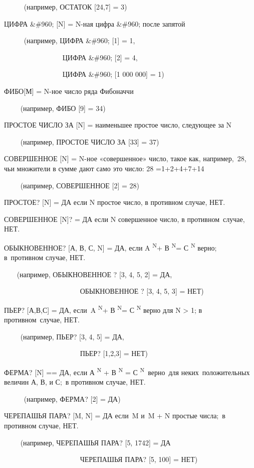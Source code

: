 \documentclass[../main.tex]{subfiles}
\begin{document}
~~~~~ (например, ОСТАТОК {[}24,7{]} = 3)

ЦИФРА \&\#960; {[}N{]} = N-ная цифра \&\#960; после запятой~~

~~~~~ (например, ЦИФРА \&\#960; {[}1{]} = 1,~

~~~~~~~~~~~~~~~~ ЦИФРА \&\#960; {[}2{]} = 4,

~~~~~~~~~~~~~~~~ ЦИФРА \&\#960; {[}1 000 000{]} = 1)

ФИБО{[}М{]} = N-ное число ряда Фибоначчи

~~~~ (например, ФИБО {[}9{]} = 34)

ПРОСТОЕ ЧИСЛО ЗА {[}N{]} = наименьшее простое число, следующее за N

~~~~ (например, ПРОСТОЕ ЧИСЛО ЗА {[}33{]} = 37)

СОВЕРШЕННОЕ {[}N{]} = N-ное «совершенное» число, такое как, например,~28, чьи множители в сумме дают само это число: 28 =1+2+4+7+14

~~~~ (например, СОВЕРШЕННОЕ {[}2{]} = 28)

ПРОСТОЕ? {[}N{]} = ДА если N простое число, в противном случае, НЕТ.

СОВЕРШЕННОЕ {[}N{]}? = ДА если N совершенное число, в противном~случае, НЕТ.

ОБЫКНОВЕННОЕ? {[}А, В, С, N{]} = ДА, если A \textsuperscript{N}+ В \textsuperscript{N}= С \textsuperscript{N} верно; в~противном случае, НЕТ.

~~~ (например, ОБЫКНОВЕННОЕ ? {[}3, 4, 5, 2{]} = ДА,

~~~~~~~~~~~~~~~~~~~~~ ОБЫКНОВЕННОЕ ? {[}3, 4, 5, 3{]} = НЕТ)

ПЬЕР? {[}А,В,С{]} = ДА, если~A \textsuperscript{N}+ В \textsuperscript{N}= С \textsuperscript{N} верно для N \textgreater{} 1; в противном~случае, НЕТ.

~~~~ (например, ПЬЕР? {[}3, 4, 5{]} = ДА,

~~~~~~~~~~~~~~~~~~~~~ ПЬЕР? {[}1,2,3{]} = НЕТ)

ФЕРМА? {[}N{]} == ДА, если А \textsuperscript{N} + В \textsuperscript{N} = С \textsuperscript{N}~верно~для неких~положительных величин А, В, и С;~в противном случае, НЕТ.

~~~~~ (например, ФЕРМА? {[}2{]} = ДА)

ЧЕРЕПАШЬЯ ПАРА? {[}M, N{]} = ДА если~M и~M + N простые числа;~в противном случае, НЕТ.

~~~~ (например, ЧЕРЕПАШЬЯ ПАРА? {[}5, 1742{]} = ДА

~~~~~~~~~~~~~~~~~~~~~ ЧЕРЕПАШЬЯ ПАРА? {[}5, 100{]} = НЕТ)
\end{document}
